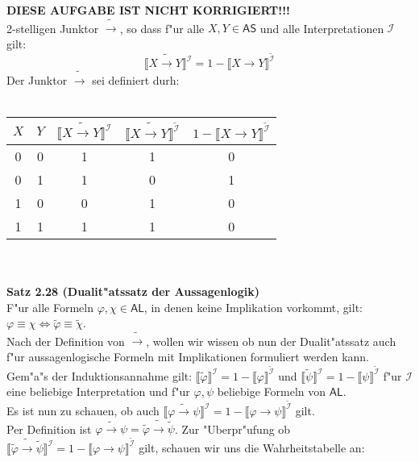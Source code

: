 \documentclass[a4paper,10pt]{article}
\begin{document}
\begin{compactenum} [(a)]
		\item \textbf{DIESE AUFGABE IST NICHT KORRIGIERT!!!} \\
		2-stelligen Junktor $\tilde{\rightarrow}$, so dass f"ur alle $X, Y \in \mathsf{AS}$ und alle Interpretationen $\mathcal{I}$ gilt: \[\llbracket X \tilde{\rightarrow} Y \rrbracket^\mathcal{I} = 1 - \llbracket X \rightarrow Y \rrbracket^{\tilde{\mathcal{I}}} \]
		Der Junktor $\tilde{\rightarrow}$ sei definiert durh:\\\\
		\begin{tabular}{c|c|c|c|c}
			$X$ & $Y$ & $\llbracket X \tilde{\rightarrow} Y \rrbracket^\mathcal{I}$ & $\llbracket X \tilde{\rightarrow} Y \rrbracket^{\tilde{\mathcal{I}}}$ &  $1 - \llbracket X \rightarrow Y \rrbracket^{\tilde{\mathcal{I}}}$\\ 
			\hline 
			0 & 0 & 1 & 1 & 0 \\ 
			\hline 
			0 & 1 & 1 & 0 & 1 \\ 
			\hline 
			1 & 0 & 0 & 1 & 0 \\ 
			\hline 
			1 & 1 & 1 & 1 & 0 \\ 
		\end{tabular} \ \\\\
		\textbf{Satz 2.28 (Dualit"atssatz der Aussagenlogik)}\\
		F"ur alle Formeln $\varphi, \chi \in \mathsf{AL}$, in denen keine Implikation vorkommt, gilt: $\varphi \equiv \chi \Leftrightarrow \tilde{\varphi} \equiv \tilde{\chi}$.\\
		Nach der Definition von $\tilde{\rightarrow}$, wollen wir wissen ob nun der Dualit"atssatz auch f"ur aussagenlogische Formeln mit Implikationen formuliert werden kann. \\
		Gem"a"s der Induktionsannahme gilt: $\llbracket \tilde{\varphi} \rrbracket^\mathcal{I} = 1 - \llbracket \varphi \rrbracket^{\tilde{\mathcal{I}}}$ und $\llbracket \tilde{\psi} \rrbracket^\mathcal{I} = 1 - \llbracket \psi \rrbracket^{\tilde{\mathcal{I}}}$ f"ur $\mathcal{I}$ eine beliebige Interpretation und f"ur $\varphi, \psi$ beliebige Formeln von $\mathsf{AL}$.\\
		Es ist nun zu schauen, ob auch $\llbracket \widetilde{\varphi \rightarrow \psi} \rrbracket^\mathcal{I} = 1 - \llbracket \varphi \rightarrow \psi \rrbracket^{\tilde{\mathcal{I}}}$ gilt.\\
		Per Definition ist $\widetilde{\varphi \rightarrow \psi} = \tilde{\varphi} \tilde{\rightarrow} \tilde{\psi}$. Zur "Uberpr"ufung ob $\llbracket \tilde{\varphi} \tilde{\rightarrow} \tilde{\psi} \rrbracket^{\mathcal{I}} = 1 - \llbracket \varphi \rightarrow \psi \rrbracket^{\tilde{\mathcal{I}}}$ gilt, schauen wir uns die Wahrheitstabelle an:\\\\

\end{compactenum}
\end{document}
